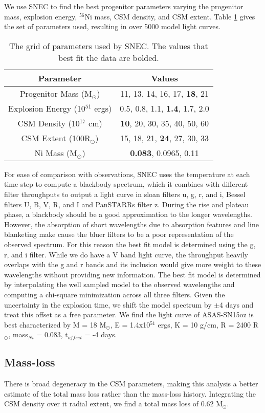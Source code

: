 \documentclass[preprint]{aastex61}
\newcommand{\msunperiod}{M$_{\odot}$}
\newcommand{\rsun}{R$_{\odot}$}
\begin{document}
We use SNEC to find the best progenitor parameters varying the progenitor mass, explosion energy, ${}^{56}$Ni mass, CSM density, and CSM extent. 
Table \ref{tb:param} gives the set of parameters used, resulting in over 5000 model light curves.
\begin{table}
\centering
\caption{The grid of parameters used by SNEC. 
The values that best fit the data are bolded.}
\label{tb:param}
\begin{tabular}{c|c}
Parameter & Values \\
\hline
Progenitor Mass (\msunperiod) & 11, 13, 14, 16, 17, {\bf 18}, 21 \\
Explosion Energy (10$^{51}$ ergs) & 0.5, 0.8, 1.1, {\bf 1.4}, 1.7, 2.0 \\
CSM Density (10$^{17}$ cm) & {\bf 10}, 20, 30, 35, 40, 50, 60 \\
CSM Extent (100R$_{\odot}$) & 15, 18, 21, {\bf 24}, 27, 30, 33 \\
Ni Mass (\msunperiod) & {\bf 0.083}, 0.0965, 0.11 \\

\end{tabular}
\end{table}
For ease of comparison with observations, SNEC uses the temperature at each time step to compute a blackbody spectrum, which it combines with different filter throughputs to output a light curve in sloan filters u, g, r, and i, Bessel filters U, B, V, R, and I and PanSTARRs filter z. 
During the rise and plateau phase, a blackbody should be a good approximation to the longer wavelengths. 
However, the absorption of short wavelengths due to absorption features and line blanketing make cause the bluer filters to be a poor representation of the observed spectrum.
For this reason the best fit model is determined using the g, r, and i filter. 
While we do have a V band light curve, the throughput heavily overlaps with the g and r bands and its inclusion would give more weight to these wavelengths without providing new information.
The best fit model is determined by interpolating the well sampled model to the observed wavelengths and computing a chi-square minimization across all three filters.
Given the uncertainty in the explosion time, we shift the model spectrum by $\pm$4 days and treat this offset as a free parameter.
We find the light curve of ASAS-SN15oz is best characterized by M = 18 \msunperiod, E = 1.4x10$^{51}$ ergs, K = 10 g/cm, R = 2400 \rsun, mass$_{Ni}$ = 0.083, t$_{offset}$ = -4 days. 
\subsection{Mass-loss}
There is broad degeneracy in the CSM parameters, making this analysis a better estimate of the total mass loss rather than the mass-loss history. 
Integrating the CSM density over it radial extent, we find a total mass loss of 0.62 \msunperiod. 
\end{document}
